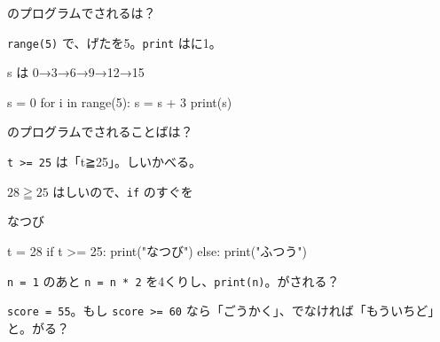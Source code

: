 \begin{reidai}[くり\R{返}{かえ}し]
\noindent\begin{minipage}[t]{0.62\linewidth}
のプログラムでされるは？\par
\kangaekata \texttt{range(5)} で、げたを5。\texttt{print} はに1。\par
\shiki s は 0→3→6→9→12→15\par
{}
\end{minipage}\hfill
\begin{minipage}[t]{0.34\linewidth}
\vspace{2pt}
\begin{bkiitcode}
s = 0
for i in range(5):
    s = s + 3
print(s)
\end{bkiitcode}
\end{minipage}
\end{reidai}


\begin{reidai}[もし～なら]
\noindent\begin{minipage}[t]{0.62\linewidth}
のプログラムでされることばは？\par
\kangaekata \texttt{t >= 25} は「t≧25」。しいかべる。\par
\shiki $28\geqq25$ はしいので、\texttt{if} のすぐを\par
\kotae なつび
\end{minipage}\hfill
\begin{minipage}[t]{0.34\linewidth}
\vspace{2pt}
\begin{bkiitcode}
t = 28
if t >= 25:
    print("なつび")
else:
    print("ふつう")
\end{bkiitcode}
\end{minipage}
\end{reidai}

\begingroup{}%
\noindent\begin{minipage}[t]{0.49\linewidth}
\begin{jibun}
\texttt{n = 1} のあと \texttt{n = n * 2} を4くりし、\texttt{print(n)}。がされる？
\end{jibun}
\end{minipage}\hfill
\begin{minipage}[t]{0.49\linewidth}
\begin{jibun}
\texttt{score = 55}。もし \texttt{score >= 60} なら「ごうかく」、でなければ「もういちど」と。がる？
\end{jibun}
\end{minipage}\par
\endgroup


